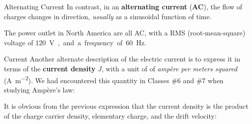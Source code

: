 \documentclass[12pt,aspectratio=169]{beamer}
\begin{document}
\begin{frame}{Alternating Current}
  In contrast, in an \textbf{alternating current} (\textbf{AC}), the flow of
  charges changes in direction, \emph{usually} as a sinusoidal function of time.
  \begin{center}
  \end{center}
  The power outlet in North America are all AC, with a RMS (root-mean-square)
  voltage of \SI{120}\volt, and a frequency of \SI{60}\hertz.
\end{frame}



\begin{frame}{Current}
  Another alternate description of the electric current is to express it in
  terms of the \textbf{current density} $J$, with a unit of of \emph{amp\`{e}re
  per meters squared} (\si{\ampere\per\meter\squared}). We had encountered this
  quantity in Classes \#6 and \#7 when studying Amp\`{e}re's law:


  It is obvious from the previous expression that the current density is the
  product of the charge carrier density, elementary charge, and the drift
  velocity:

\end{frame}
\end{document}
